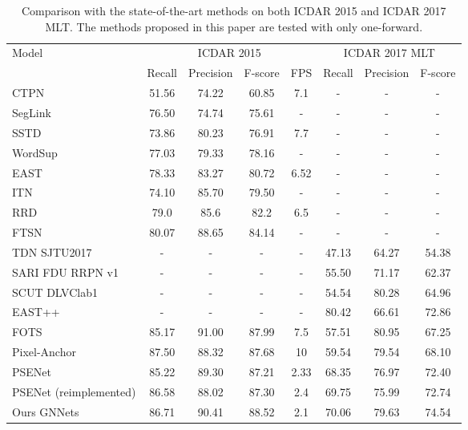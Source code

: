 \documentclass[10pt,twocolumn,letterpaper]{article}
\begin{document}
\begin{table*}[t]
\renewcommand{\arraystretch}{1.1}
\footnotesize
\centering
\caption{Comparison with the state-of-the-art methods on both ICDAR 2015 and ICDAR 2017 MLT. The methods proposed in this paper are tested with only one-forward.
}\label{table:comp-state-of-the-art}
    \begin{tabular}{|l|c|c|c|c|c|c|c|}
      \hline
\multirow{2}{*}{Model} & \multicolumn{4}{|c|}{ICDAR 2015} &

      \multicolumn{3}{|c|}{ICDAR 2017 MLT}  \\ \cline{2-8}
      &Recall & Precision & F-score & FPS & Recall & Precision  & F-score \\ \cline{1-8}

CTPN \cite{yin2015multi} & 51.56 & 74.22 & 60.85 & 7.1 & - & - & -\\
      SegLink \cite{Shi2017} & 76.50 & 74.74 & 75.61 & - & - & - & -\\
      SSTD \cite{He2017a} & 73.86 & 80.23 & 76.91 & 7.7 & - & - & -\\
      WordSup \cite{Hu2017} & 77.03 & 79.33 & 78.16 & - & - & - & -\\
      EAST \cite{Zhou2017} & 78.33 & 83.27 & 80.72 & 6.52 & - & - & -\\
      ITN \cite{wang2018geometry} & 74.10 & 85.70 & 79.50 & - & - & - & -\\
      RRD \cite{liao2018rotation} & 79.0 & 85.6 & 82.2 & 6.5 & - & - & -\\
      FTSN \cite{dai2018fused} & 80.07 & 88.65 & 84.14 & - & - & - & -\\


      TDN SJTU2017 \cite{mlt} & - & - & - & - & 47.13 & 64.27 & 54.38 \\
      SARI FDU RRPN v1 \cite{mlt} & - & - & - & - & 55.50 & 71.17 & 62.37 \\
      SCUT DLVClab1 \cite{mlt} & - & - & - & - & 54.54 & 80.28 & 64.96 \\
      EAST++ \cite{mlt} & - & - & - & -  & 80.42 & 66.61 &72.86 \\



      FOTS \cite{liu2018fots} & 85.17 & \color{red} 91.00 & 87.99 & 7.5 & 57.51 & \color{red}80.95 & 67.25 \\
      Pixel-Anchor \cite{Li2018pixel} & 87.50 & 88.32 & 87.68 & 10 &59.54 & 79.54 & 68.10\\
      PSENet \cite{li2018shape} & 85.22 & 89.30 & 87.21 & 2.33 & 68.35 & 76.97 & 72.40 \\


\hline
PSENet (reimplemented) & 86.58 & 88.02 & 87.30 & 2.4 & 69.75 & 75.99 & 72.74 \\
      Ours GNNets& \color{red}86.71 & \color{blue} 90.41 & \color{red}88.52 & 2.1 & \color{red}70.06 & \color{blue}79.63 & \color{red}74.54 \\
\hline
    \end{tabular}
\vspace{-3mm}
\end{table*}
\end{document}
